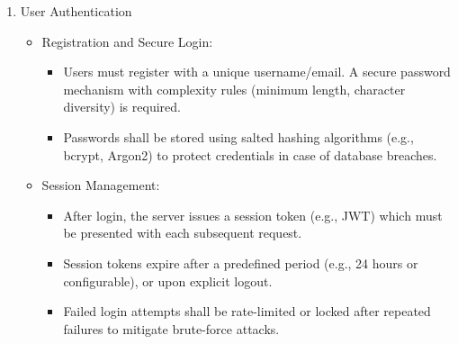 \documentclass{article}
\begin{document}
\begin{enumerate}[label=\textbf{FR\arabic*:}]
    \item User Authentication
    \begin{itemize}
        \item Registration and Secure Login:
        \begin{itemize}
            \item Users must register with a unique username/email. A secure password mechanism with complexity rules (minimum length, character diversity) is required.
            \item Passwords shall be stored using salted hashing algorithms (e.g., bcrypt, Argon2) to protect credentials in case of database breaches.
        \end{itemize}
        \item Session Management:
        \begin{itemize}
            \item After login, the server issues a session token (e.g., JWT) which must be presented with each subsequent request.
            \item Session tokens expire after a predefined period (e.g., 24 hours or configurable), or upon explicit logout.
            \item Failed login attempts shall be rate-limited or locked after repeated failures to mitigate brute-force attacks.
        \end{itemize}
    \end{itemize}
    

\end{enumerate}
\end{document}
